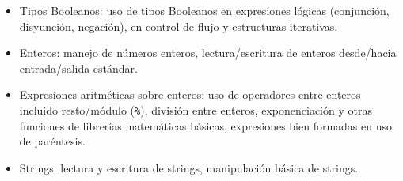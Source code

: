 \begin{itemize}
\item[\basic] Tipos Booleanos: uso de tipos Booleanos en expresiones lógicas (conjunción, disyunción, negación), en control de flujo y estructuras iterativas.

\item[\basic] Enteros: manejo de números enteros, lectura/escritura de enteros desde/hacia entrada/salida estándar.

\item[\basic] Expresiones aritméticas sobre enteros: uso de operadores entre enteros incluido resto/módulo (\texttt{\%}),
división entre enteros, exponenciación y otras funciones de librerías matemáticas básicas, 
expresiones bien formadas en uso de paréntesis.

\item[\basic] Strings: lectura y escritura de strings, manipulación básica de strings.

\end{itemize}


